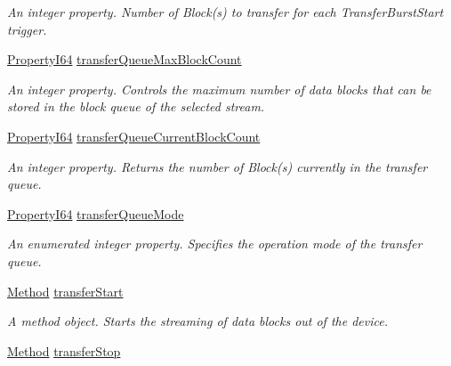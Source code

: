 \begin{DoxyCompactItemize}
\begin{DoxyCompactList}\small\item\em An integer property. Number of Block(s) to transfer for each Transfer\+Burst\+Start trigger. \end{DoxyCompactList}\item 
\hyperlink{group___common_interface_ga81749b2696755513663492664a18a893}{Property\+I64} \hyperlink{classmv_i_m_p_a_c_t_1_1acquire_1_1_gen_i_cam_1_1_transfer_control_a048b7b40ca8cc72206f93a902b7206a8}{transfer\+Queue\+Max\+Block\+Count}
\begin{DoxyCompactList}\small\item\em An integer property. Controls the maximum number of data blocks that can be stored in the block queue of the selected stream. \end{DoxyCompactList}\item 
\hyperlink{group___common_interface_ga81749b2696755513663492664a18a893}{Property\+I64} \hyperlink{classmv_i_m_p_a_c_t_1_1acquire_1_1_gen_i_cam_1_1_transfer_control_ac2afe03dc422b31cc68480a9e843f11f}{transfer\+Queue\+Current\+Block\+Count}
\begin{DoxyCompactList}\small\item\em An integer property. Returns the number of Block(s) currently in the transfer queue. \end{DoxyCompactList}\item 
\hyperlink{group___common_interface_ga81749b2696755513663492664a18a893}{Property\+I64} \hyperlink{classmv_i_m_p_a_c_t_1_1acquire_1_1_gen_i_cam_1_1_transfer_control_a813d1478f6f76edce556c41ffc2e4898}{transfer\+Queue\+Mode}
\begin{DoxyCompactList}\small\item\em An enumerated integer property. Specifies the operation mode of the transfer queue. \end{DoxyCompactList}\item 
\hyperlink{classmv_i_m_p_a_c_t_1_1acquire_1_1_method}{Method} \hyperlink{classmv_i_m_p_a_c_t_1_1acquire_1_1_gen_i_cam_1_1_transfer_control_a9300b81aca627165f0ff70b4fc0f6d3c}{transfer\+Start}
\begin{DoxyCompactList}\small\item\em A method object. Starts the streaming of data blocks out of the device. \end{DoxyCompactList}\item 
\hyperlink{classmv_i_m_p_a_c_t_1_1acquire_1_1_method}{Method} \hyperlink{classmv_i_m_p_a_c_t_1_1acquire_1_1_gen_i_cam_1_1_transfer_control_a3070e07a3a448603af012a8f2eef0bf0}{transfer\+Stop}

\end{DoxyCompactItemize}
